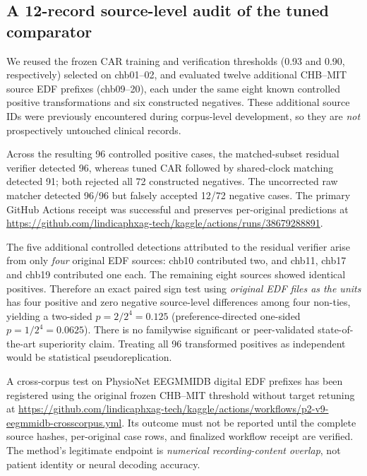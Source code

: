 \subsection{A 12-record source-level audit of the tuned comparator}
We reused the frozen CAR training and verification thresholds
(0.93 and 0.90, respectively) selected on chb01--02,
and evaluated twelve additional CHB--MIT source EDF prefixes
(chb09--20), each under the same eight known controlled
positive transformations and six constructed negatives.
These additional source IDs were previously encountered
during corpus-level development, so they are \emph{not}
prospectively untouched clinical records.

Across the resulting 96 controlled positive cases,
the matched-subset residual verifier detected 96,
whereas tuned CAR followed by shared-clock matching
detected 91; both rejected all 72 constructed negatives.
The uncorrected raw matcher detected 96/96 but falsely
accepted 12/72 negative cases. The primary GitHub Actions
receipt was successful and preserves per-original
predictions at
\url{https://github.com/lindicaphxag-tech/kaggle/actions/runs/38679288891}.

The five additional controlled detections attributed to
the residual verifier arise from only \emph{four} original
EDF sources: chb10 contributed two, and chb11, chb17
and chb19 contributed one each. The remaining eight
sources showed identical positives. Therefore an exact
paired sign test using \emph{original EDF files as the
units} has four positive and zero negative source-level
differences among four non-ties, yielding a
two-sided $p=2/2^4=0.125$ (preference-directed
one-sided $p=1/2^4=0.0625$). There is no familywise
significant or peer-validated state-of-the-art superiority
claim. Treating all 96 transformed positives as independent
would be statistical pseudoreplication.

A cross-corpus test on PhysioNet EEGMMIDB digital EDF
prefixes has been registered using the original frozen
CHB--MIT threshold without target retuning at
\url{https://github.com/lindicaphxag-tech/kaggle/actions/workflows/p2-v9-eegmmidb-crosscorpus.yml}.
Its outcome must not be reported until the complete source
hashes, per-original case rows, and finalized workflow
receipt are verified. The method's legitimate endpoint is
\emph{numerical recording-content overlap}, not patient
identity or neural decoding accuracy.
